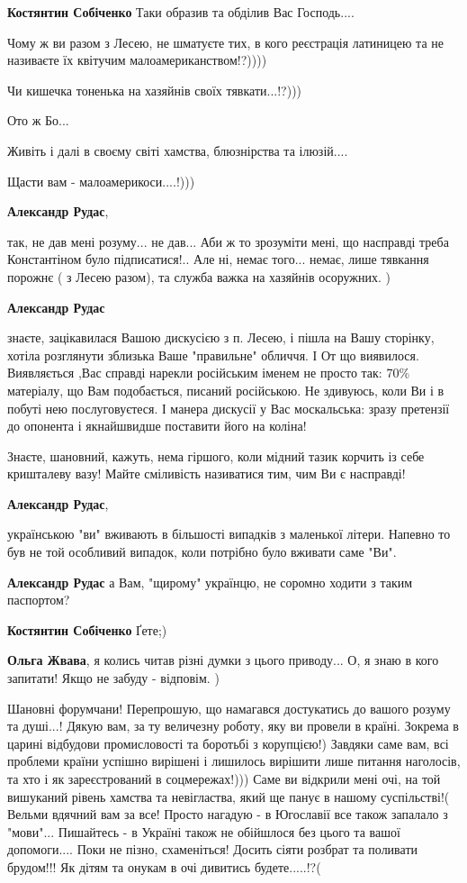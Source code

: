 \begin{itemize}
\begin{itemize}
\textbf{Костянтин Собіченко}
Таки образив та обділив Вас Господь....

Чому ж ви разом з Лесею, не шматуєте тих, в кого реєстрація латиницею та не
називаєте їх квітучим малоамериканством!?))))

Чи кишечка тоненька на хазяйнів своїх тявкати...!?)))

Ото ж Бо...

Живіть і далі в своєму світі хамства, блюзнірства та ілюзій....

Щасти вам - малоамерикоси....!)))

\textbf{Александр Рудас}, 

так, не дав мені розуму... не дав... Аби ж то зрозуміти мені, що насправді
треба Константіном було підписатися!.. Але ні, немає того... немає, лише
тявкання порожнє ( з Лесею разом), та служба важка на хазяйнів осоружних. )

\textbf{Александр Рудас} 

знаєте, зацікавилася Вашою дискусією з п. Лесею, і пішла на Вашу сторінку,
хотіла розглянути зблизька Ваше "правильне" обличчя. І От що виявилося.
Виявляється ,Вас справді нарекли російським іменем не просто так: 70\%
матеріалу, що Вам подобається, писаний російською. Не здивуюсь, коли Ви і в
побуті нею послуговуєтеся. І манера дискусії у Вас москальська: зразу претензії
до опонента і якнайшвидше поставити його на коліна!

Знаєте, шановний, кажуть, нема гіршого, коли мідний тазик корчить із себе
кришталеву вазу! Майте сміливість називатися тим, чим Ви є насправді!

\textbf{Александр Рудас}, 

українською "ви" вживають в більшості випадків з маленької літери. Напевно то
був не той особливий випадок, коли потрібно було вживати саме "Ви".

\textbf{Александр Рудас} а Вам, "щирому" українцю, не соромно ходити з таким паспортом?

\textbf{Костянтин Собіченко} Ґете;)

\textbf{Ольга Жвава}, я колись читав різні думки з цього приводу... О, я знаю в кого запитати! Якщо не забуду - відповім. )


\obeycr
Шановні форумчани!
Перепрошую, що намагався достукатись до вашого розуму та душі...!
Дякую вам, за ту величезну роботу, яку ви провели в країні.
Зокрема в царині відбудови промисловості та боротьбі з корупцією!)
Завдяки саме вам, всі проблеми країни успішно вирішені і лишилось вирішити лише питання наголосів, та хто і як зареєстрований в соцмережах!)))
Саме ви відкрили мені очі, на той вишуканий рівень хамства та невігластва, який ще панує в нашому суспільстві!(
Вельми вдячний вам за все!
Просто нагадую - в Югославії все також запалало з "мови"...
Пишайтесь - в Україні також не обійшлося без цього та вашої допомоги....
Поки не пізно, схаменіться! Досить сіяти розбрат та поливати брудом!!!
Як дітям та онукам в очі дивитись будете.....!?(
\restorecr


\end{itemize}
\end{itemize}
